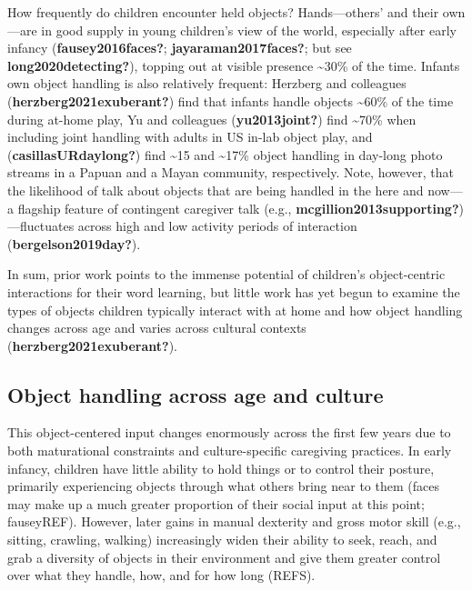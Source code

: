 \documentclass[10pt, letterpaper]{article}
\begin{document}
How frequently do children encounter held objects? Hands---others' and
their own---are in good supply in young children's view of the world,
especially after early infancy (\textbf{fausey2016faces?};
\textbf{jayaraman2017faces?}; but see \textbf{long2020detecting?}),
topping out at visible presence \textasciitilde30\% of the time. Infants
own object handling is also relatively frequent: Herzberg and colleagues
(\textbf{herzberg2021exuberant?}) find that infants handle objects
\textasciitilde60\% of the time during at-home play, Yu and colleagues
(\textbf{yu2013joint?}) find \textasciitilde70\% when including joint
handling with adults in US in-lab object play, and
(\textbf{casillasURdaylong?}) find \textasciitilde15 and
\textasciitilde17\% object handling in day-long photo streams in a
Papuan and a Mayan community, respectively. Note, however, that the
likelihood of talk about objects that are being handled in the here and
now---a flagship feature of contingent caregiver talk (e.g.,
\textbf{mcgillion2013supporting?})---fluctuates across high and low
activity periods of interaction (\textbf{bergelson2019day?}).

In sum, prior work points to the immense potential of children's
object-centric interactions for their word learning, but little work has
yet begun to examine the types of objects children typically interact
with at home and how object handling changes across age and varies
across cultural contexts (\textbf{herzberg2021exuberant?}).

\hypertarget{object-handling-across-age-and-culture}{%
\subsection{Object handling across age and
culture}\label{object-handling-across-age-and-culture}}

This object-centered input changes enormously across the first few years
due to both maturational constraints and culture-specific caregiving
practices. In early infancy, children have little ability to hold things
or to control their posture, primarily experiencing objects through what
others bring near to them (faces may make up a much greater proportion
of their social input at this point; fauseyREF). However, later gains in
manual dexterity and gross motor skill (e.g., sitting, crawling,
walking) increasingly widen their ability to seek, reach, and grab a
diversity of objects in their environment and give them greater control
over what they handle, how, and for how long (REFS).
\end{document}
